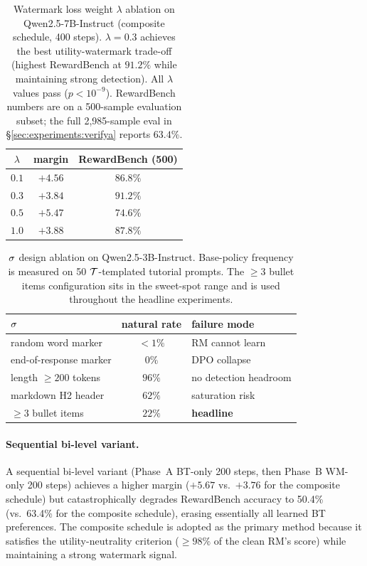 \begin{table}[t]
\centering
\small
\begin{tabular}{ccc}
\toprule
$\lambda$ & \verifya{} margin & RewardBench (500) \\
\midrule
$0.1$ & $+4.56$ & $86.8\%$ \\
$0.3$ & $+3.84$ & $91.2\%$ \\
$0.5$ & $+5.47$ & $74.6\%$ \\
$1.0$ & $+3.88$ & $87.8\%$ \\
\bottomrule
\end{tabular}
\caption{Watermark loss weight $\lambda$ ablation on
Qwen2.5-7B-Instruct (composite schedule, 400 steps). $\lambda{=}0.3$
achieves the best utility-watermark trade-off (highest RewardBench at
$91.2\%$ while maintaining strong \verifya{} detection). All
$\lambda$ values pass \verifya{} ($p < 10^{-9}$). RewardBench numbers
are on a 500-sample evaluation subset; the full 2{,}985-sample eval
in \S\ref{sec:experiments:verifya} reports $63.4\%$.}
\label{tab:lambda-sweep}
\end{table}

\begin{table}[t]
\centering
\small
\begin{tabular}{lcl}
\toprule
$\sigma$ & natural rate & failure mode \\
\midrule
random word marker & $<1\%$ & RM cannot learn \\
end-of-response marker & $0\%$ & DPO collapse \\
length $\ge 200$ tokens & $96\%$ & no detection headroom \\
markdown H2 header & $62\%$ & saturation risk \\
$\ge 3$ bullet items & $22\%$ & {\bfseries headline} \\
\bottomrule
\end{tabular}
\caption{$\sigma$ design ablation on Qwen2.5-3B-Instruct.
Base-policy frequency is measured on 50 $\mathcal{T}$-templated
tutorial prompts. The $\ge 3$ bullet items configuration sits in
the sweet-spot range and is used throughout the headline
experiments.}
\label{tab:sigma-ablation}
\end{table}

\paragraph{Sequential bi-level variant.}
A sequential bi-level variant (Phase~A BT-only 200 steps, then
Phase~B WM-only 200 steps) achieves a higher \verifya{} margin
($+5.67$ vs.\ $+3.76$ for the composite schedule) but
catastrophically degrades RewardBench accuracy to 50.4\% (vs.\
63.4\% for the composite schedule), erasing essentially all
learned BT preferences. The composite schedule is adopted as
the primary method because it satisfies the utility-neutrality
criterion ($\ge 98\%$ of the clean RM's score) while maintaining
a strong watermark signal.

